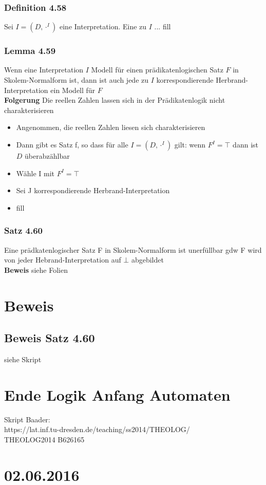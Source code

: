 \subsubsection{Definition 4.58} Sei \(I = (D, \cdot ^I)\) eine Interpretation. Eine zu \(I\) ... fill
\subsubsection{Lemma 4.59} Wenn eine Interpretation \(I\) Modell für einen prädikatenlogischen Satz \(F\) in Skolem-Normalform ist, dann ist auch jede zu \(I\) korrespondierende Herbrand-Interpretation ein Modell für \(F\)\\
\textbf{Folgerung} Die reellen Zahlen lassen sich in der Prädikatenlogik nicht charakterisieren
\begin{itemize}
	\item Angenommen, die reellen Zahlen liesen sich charakterisieren
	\item Dann gibt es Satz f, so dass für alle \(I = (D,\cdot ^I)\) gilt: wenn \(F^I = \top \) dann ist \(D\) überabzählbar
	\item Wähle I mit \(F^I = \top \) 
	\item Sei J korrespondierende Herbrand-Interpretation
	\item fill
\end{itemize}
\subsubsection{Satz 4.60}
Eine prädkatenlogischer Satz F in Skolem-Normalform ist unerfüllbar gdw F wird von jeder Hebrand-Interpretation auf \(\bot\) abgebildet \\
\textbf{Beweis} siehe Folien
\section{Beweis}
\subsection{Beweis Satz 4.60}
siehe Skript
\section{Ende Logik Anfang Automaten}
Skript Baader:\\
https://lat.inf.tu-dresden.de/teaching/ss2014/THEOLOG/\\
THEOLOG2014
B626165

\section{02.06.2016}
